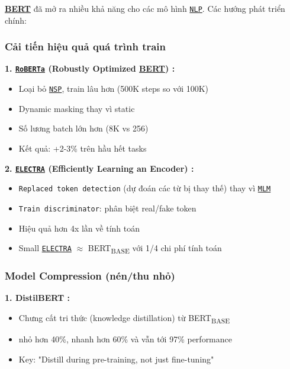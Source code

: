 \hyperref[acro:bert]{\textbf{BERT}} đã mở ra nhiều khả năng cho các mô hình \hyperref[acro:nlp]{\texttt{NLP}}. Các hướng phát triển chính:

\subsubsection{Cải tiến hiệu quả quá trình train}

\textbf{1. \hyperref[acro:roberta]{\texttt{RoBERTa}} (Robustly Optimized \hyperref[acro:bert]{\textbf{BERT}}) \cite{liu2019roberta}:}
\begin{itemize}
    \item Loại bỏ \hyperref[acro:nsp]{\texttt{NSP}}, train lâu hơn (500K steps so với 100K)
    \item Dynamic masking thay vì static
    \item Số lương batch lớn hơn (8K vs 256)
    \item Kết quả: +2-3\% trên hầu hết tasks
\end{itemize}

\textbf{2. \hyperref[acro:electra]{\texttt{ELECTRA}} (Efficiently Learning an Encoder) \cite{clark2020electra}:}
\begin{itemize}
    \item \texttt{Replaced token detection} (dự đoán các từ bị thay thế) thay vì \hyperref[acro:mlm]{\texttt{MLM}}
    \item \texttt{Train discriminator}: phân biệt real/fake token
    \item Hiệu quả hơn 4x lần về tính toán
    \item Small \hyperref[acro:electra]{\texttt{ELECTRA}} $\approx$ BERT\textsubscript{BASE} với 1/4 chi phí tính toán
\end{itemize}

\subsubsection{Model Compression (nén/thu nhỏ)}

\textbf{1. DistilBERT \cite{sanh2019distilbert}:}
\begin{itemize}
    \item Chưng cất tri thức (knowledge distillation) từ BERT\textsubscript{BASE}
    \item nhỏ hơn 40\%, nhanh hơn 60\% và vẫn tới 97\% performance
    \item Key: "Distill during pre-training, not just fine-tuning"
\end{itemize}

